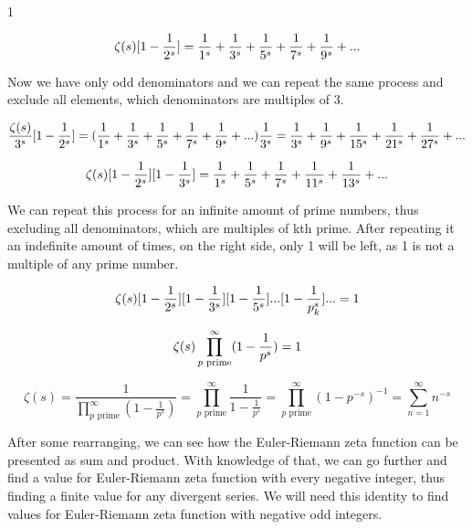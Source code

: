 1\documentclass[a4paper]{article}
\begin{document}
\begin{equation*}
  \zeta(s)[1-\frac{1}{2^s}]=\frac{1}{1^s}+\frac{1}{3^s}+\frac{1}{5^s}+
  \frac{1}{7^s}+\frac{1}{9^s}+...\\
  \end{equation*}

Now we have only odd denominators and we can repeat the same process and exclude all elements, which denominators are
multiples of 3.

\begin{equation*}
  \frac{\zeta(s)}{3^s}[1-\frac{1}{2^s}] = (\frac{1}{1^s}+\frac{1}{3^s}+\frac{1}{5^s}+
  \frac{1}{7^s}+\frac{1}{9^s}+...)\frac{1}{3^s}=\frac{1}{3^s}+\frac{1}{9^s}+\frac{1}{15^s}+
  \frac{1}{21^s}+\frac{1}{27^s}+...\\
\end{equation*}

\begin{equation*}
  \zeta(s)[1-\frac{1}{2^s}][1-\frac{1}{3^s}] = \frac{1}{1^s}+\frac{1}{5^s}+\frac{1}{7^s}+
  \frac{1}{11^s}+\frac{1}{13^s}+...\\
  \end{equation*}

We can repeat this process for an infinite amount of prime numbers, thus excluding all
denominators, which are multiples of kth prime. After repeating it an indefinite amount of times,
on the right side, only 1 will be left, as 1 is not a multiple of any prime number.

\begin{equation*}
  \zeta(s)[1-\frac{1}{2^s}][1-\frac{1}{3^s}][1-\frac{1}{5^s}]...[1-\frac{1}{p_k^s}]...=1\\
  \end{equation*}

\begin{equation*}
    \zeta(s)\prod_{p \text{ prime}}^{\infty} (1-\frac{1}{p^s})=1\\
\end{equation*}

\begin{equation*}
  \zeta(s)=\frac{1}{\prod_{p \text{ prime}}^{\infty} (1-\frac{1}{p^s})}=\prod_{p \text{ prime}}^{\infty} \frac{1}{1-\frac{1}{p^s}}=
  \prod_{p \text{ prime}}^{\infty} (1-p^{-s})^{-1}=\sum_{n=1}^{\infty} n^{-s}
  \end{equation*}

After some rearranging, we can see how the Euler-Riemann zeta function can be presented as sum
and product. With knowledge of that, we can go further and find a value for Euler-Riemann zeta
function with every negative integer, thus finding a finite value for any divergent series. We will
need this identity to find values for Euler-Riemann zeta function with negative odd integers.\\
\end{document}
